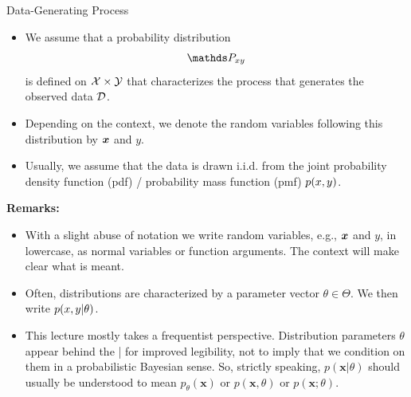\documentclass[11pt,compress,t,notes=noshow, xcolor=table]{beamer}
\begin{document}
\begin{vbframe}{Data-Generating Process}

\begin{itemize}
\item We assume that a probability distribution
$$
\Pxy
$$
is defined on $\mathcal{X} \times \mathcal{Y}$ that characterizes the process that generates the observed data $\mathcal{D}$.
\item Depending on the context, we denote the random variables following this distribution by $\bm{x}$ and $y$.
\item Usually, we assume that the data is drawn i.i.d. from the joint probability density function (pdf) / probability mass function (pmf) $p(x,y)$.
\end{itemize}

\framebreak

\textbf{Remarks:}
\begin{itemize}
\item With a slight abuse of notation we write random variables, e.g., $\bm{x}$ and $y$, in lowercase, as normal
variables or function arguments. The context will make clear what is meant.
\item Often, distributions are characterized by a parameter vector $\theta \in \Theta$. We then write $p(x, y | \theta)$.
\item This lecture mostly takes a frequentist perspective. Distribution parameters $\theta$ appear behind the | for improved legibility, not to imply that we condition on them in a probabilistic Bayesian sense.
So, strictly speaking, $p(\bm{x} | \theta)$ should usually be understood to mean $p_\theta(\bm{x})$ or $p(\bm{x}, \theta)$ or $p(\bm{x}; \theta)$.
\end{itemize}

\end{vbframe}




\endlecture
\end{document}
